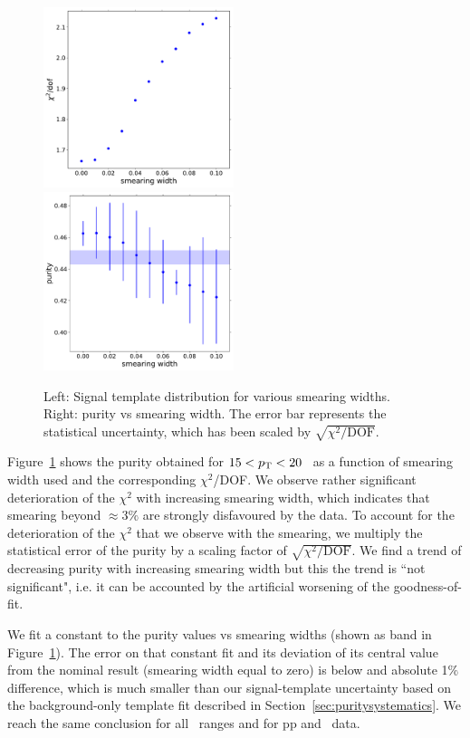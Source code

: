 \begin{figure}
	\center
	\includegraphics[width=0.495\textwidth]{Appendices/smeared-chi2s-pp-cluster_Lambda-15-20.pdf}
		\includegraphics[width=0.495\textwidth]{Appendices/smeared-purities-pp-cluster_Lambda-15-20.pdf}
		\caption{Left: Signal template distribution for various smearing widths. Right: purity vs smearing width. The error bar represents the statistical uncertainty, which has been scaled by $\sqrt{\chi^{2}/\mathrm{DOF}}$.}
	\label{fig:smearingSignalShape}
\end{figure}

Figure~\ref{fig:smearingSignalShape} shows the purity obtained for $15<p_{\mathrm{T}}<20$ \GeVc~as a function of smearing width used and the corresponding $\chi^{2}$/DOF. We observe rather significant deterioration of the $\chi^{2}$ with increasing smearing width, which indicates that smearing beyond $\approx3\%$ are strongly disfavoured by the data. To account for the deterioration of the $\chi^{2}$ that we observe with the smearing, we multiply the statistical error of the purity by a scaling factor of $\sqrt{\chi^{2}/\mathrm{DOF}}$. We find a trend of decreasing purity with increasing smearing width but this the trend is ``not significant", i.e. it can be accounted by the artificial worsening of the goodness-of-fit. 


We fit a constant to the purity values vs smearing widths (shown as band in Figure~\ref{fig:smearingSignalShape}). The error on that constant fit and its deviation of its central value from the nominal result (smearing width equal to zero) is below and absolute 1$\%$ difference, which is much smaller than our signal-template uncertainty based on the background-only template fit described in Section~\ref{sec:puritysystematics}. We reach the same conclusion for all \pt~ranges and for pp and \pPb~data.  


